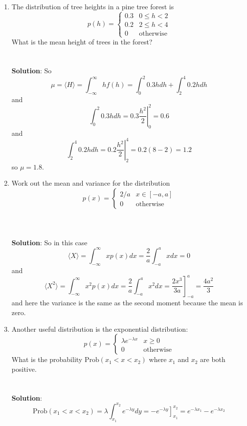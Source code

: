 \documentclass[11pt,a4paper]{scrartcl}
\begin{document}
\begin{enumerate}
\item The distribution of tree heights in a pine tree forest is 
\begin{equation}
p(h)=\left\{\begin{array}{cc}0.3& 0\le h <2\\0.2& 2\le h<4\\0&\mbox{otherwise}\end{array}\right.
\end{equation}
What is the mean height of trees in the forest?
\\ \\ \\
\textbf{Solution}: So 
\begin{equation}
\mu =\langle H\rangle=\int_{-\infty}^\infty hf(h)=\int_{0}^2 {0.3h}dh+\int_2^4{0.2h}dh
\end{equation}
and
\begin{equation}
\int_{0}^2 {0.3h}dh=\left.0.3\frac{h^2}{2}\right|_0^2=0.6
\end{equation}
and
\begin{equation}
\int_{2}^4 {0.2h}dh=\left.0.2\frac{h^2}{2}\right|_2^4=0.2 (8-2)=1.2
\end{equation}
so $\mu=1.8$.


\item Work out the mean and variance for the distribution
  \begin{equation}
    p(x)=\left\{\begin{array}{ll}2/a&x\in [-a,a]\\0&\mbox{otherwise}\end{array}\right.
  \end{equation}
\\ \\ \\
\textbf{Solution}: So in this case
\begin{equation}
  \langle X\rangle =\int_{-\infty}^\infty xp(x)dx=\frac{2}{a}\int_{-a}^a xdx=0
\end{equation}
and
\begin{equation}
  \langle X^2\rangle =\int_{-\infty}^\infty x^2p(x)dx=\frac{2}{a}\int_{-a}^a x^2dx=\left.\frac{2x^3}{3a}\right]_{-a}^a=\frac{4a^2}{3}
\end{equation}
and here the variance is the same as the second moment because the mean is zero.
  
\item Another useful distribution is the exponential distribution:
$$
p(x)=\left\{\begin{array}{cc}\lambda e^{-\lambda x}& x\ge 0\\ 0&\mbox{otherwise}\end{array}\right.
$$
What is the probability $\mbox{Prob}(x_1 < x <x_2)$ where $x_1$ and $x_2$ are both positive.
  \\ \\ \\ \textbf{Solution}: 
\begin{equation}
\mbox{Prob}(x_1 < x <x_2)=\lambda \int_{x_1}^{x_2} e^{-\lambda y}dy=-\left. e^{-\lambda y} \right]_{x_1}^{x_2}=e^{-\lambda x_1}-e^{-\lambda x_2}
\end{equation}


\end{enumerate}
\end{document}
